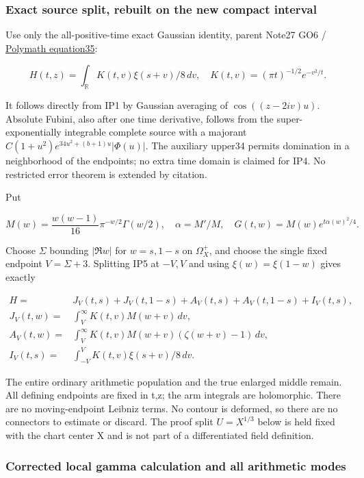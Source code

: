 \subsubsection{Exact source split, rebuilt on the new compact interval}
\label{subsec:ip-2}

Use only the all-positive-time exact Gaussian identity, parent Note27 GO6 / \href{https://arxiv.org/html/1904.12438v2#S4}{Polymath equation35}:

\[
H(t,z)=\int_{\mathbb R}K(t,v)\xi(s+v)/8\,dv,
\quad K(t,v)=(\pi t)^{-1/2}e^{-v^2/t}.
\tag{IP5}\label{eq:ansatz-ip5}
\]

It follows directly from IP1 by Gaussian averaging of \(\cos((z-2iv)u)\). Absolute Fubini, also after one time derivative, follows from the super-exponentially integrable complete source with a majorant \(C(1+u^{2})e^{34u^{2}+(b+1)u}|\Phi(u)|\). The auxiliary upper34 permits domination in a neighborhood of the endpoints; no extra time domain is claimed for IP4. No restricted error theorem is extended by citation.

Put

\[
M(w)=\frac{w(w-1)}{16}\pi^{-w/2}\Gamma(w/2),\quad
\alpha=M'/M,\quad G(t,w)=M(w)e^{t\alpha(w)^2/4}.
\tag{IP6}\label{eq:ansatz-ip6}
\]

Choose \(\Sigma\) bounding \(|\Re w|\) for \(w=s,1-s\) on \(\Omega_{X}^+\), and choose the single fixed endpoint \(V=\Sigma+3\). Splitting IP5 at \(-V,V\) and using \(\xi(w)=\xi(1-w)\) gives exactly

\[
\begin{split}
H={}&J_V(t,s)+J_V(t,1-s)+A_V(t,s)+A_V(t,1-s)+I_V(t,s),\\
J_V(t,w)={}&\int_V^\infty K(t,v)M(w+v)\,dv,\\
A_V(t,w)={}&\int_V^\infty K(t,v)M(w+v)(\zeta(w+v)-1)\,dv,\\
I_V(t,s)={}&\int_{-V}^V K(t,v)\xi(s+v)/8\,dv.
\end{split}
\tag{IP7}\label{eq:ansatz-ip7}
\]

The entire ordinary arithmetic population and the true enlarged middle remain. All defining endpoints are fixed in t,z; the arm integrals are holomorphic. There are no moving-endpoint Leibniz terms. No contour is deformed, so there are no connectors to estimate or discard. The proof split \(U=X^{1/3}\) below is held fixed with the chart center X and is not part of a differentiated field definition.

\subsubsection{Corrected local gamma calculation and all arithmetic modes}
\label{subsec:ip-3}

